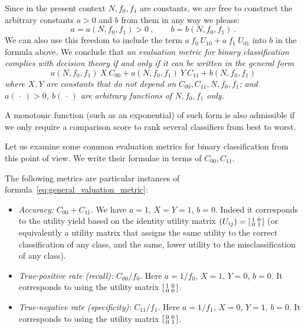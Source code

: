 \documentclass[\ifafour a4paper,12pt,\else a5paper,10pt,\fi%
onecolumn,oneside,article,%
british%
]{memoir}
\theoremstyle{remark}
\theoremstyle{innote}
\newcommand*{\dotv}{\mathord{\,\cdot\,}}%
\renewcommand*{\|}[1][]{\nonscript\:#1\vert\nonscript\:\mathopen{}}
\newcommand*{\itemyes}{{\fontencoding{U}\fontfamily{pzd}\selectfont\symbol{51}}}
\newcommand*{\cx}{X}
\newcommand*{\cy}{Y}
\begin{document}
Since in the present context $N, f_{0}, f_{1}$ are constants, we are free to construct the arbitrary constants $a > 0$ and $b$ from them in any way we please:
\begin{equation}
  \label{eq:constants_functions}
  a = a(N, f_{0}, f_{1}) > 0\ , \qquad
  b = b(N, f_{0}, f_{1}) \ .
\end{equation}
We can also use this freedom to include the term $a\ f_{0}\ U_{10} + a\ f_{1}\ U_{01}$ into $b$ in the formula above. We conclude that \emph{an evaluation metric for binary classification complies with decision theory if and only if it can be written in the general form}
\begin{equation}
  \label{eq:general_valuation_metric}
  a(N, f_{0}, f_{1})\ \cx\ C_{00} +
  a(N, f_{0}, f_{1})\ \cy\  C_{11} +
  b(N, f_{0}, f_{1})
\end{equation}
\emph{where $\cx,\cy$ are constants that do not depend on $C_{00}, C_{11}, N, f_{0}, f_{1}$; and $a(\dotv)>0$, $b(\dotv)$ are arbitrary functions of $N, f_{0}, f_{1}$ only.}

A monotonic function (such as an exponential) of such form is also admissible if we only require a comparison score to rank several classifiers from best to worst.

Let us examine some common evaluation metrics for binary classification from this point of view. We write their formulae in terms of $C_{00}, C_{11}$.

The following metrics are particular instances of formula~\eqref{eq:general_valuation_metric}:
\begin{itemize}
\item[\itemyes] \emph{Accuracy:} $C_{00}+C_{11}$. We have $a=1$, $\cx=\cy=1$, $b=0$. Indeed it corresponds to the utility yield based on the identity utility matrix $(U_{ij}) = \begin{bsmallmatrix} 1&0\\0&1 \end{bsmallmatrix}$ (or equivalently a utility matrix that assigns the same utility to the correct classification of any class, and the same, lower utility to the misclassification of any class).
  
\item[\itemyes] \emph{True-positive rate (recall):} $C_{00}/f_{0}$. Here $a=1/f_{0}$, $\cx=1$, $\cy=0$, $b=0$. It corresponds to using the utility matrix $\begin{bsmallmatrix} 1&0\\0&0 \end{bsmallmatrix}$. 

\item[\itemyes] \emph{True-negative rate (specificity):} $C_{11}/f_{1}$. Here $a=1/f_{1}$, $\cx=0$, $\cy=1$, $b=0$. It corresponds to using the utility matrix $\begin{bsmallmatrix} 0&0\\0&1 \end{bsmallmatrix}$. 
\end{itemize}
\end{document}
